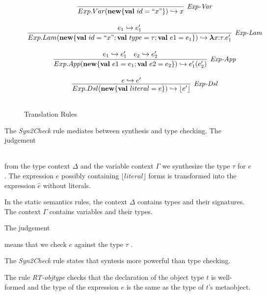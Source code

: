 \begin{figure}
\centering
\[
\begin{array}{c}

\infer[\textit{Exp-Var}]
	{Exp.Var(\keyw{new} \{\keyw{val}\ id=``x"\}) \hookrightarrow x  }
	{ } \\[3ex]

\infer[\textit{Exp-Lam}]
	{Exp.Lam(\keyw{new} \{\keyw{val}\ id=``x"; \keyw{val}\ type=\tau; \keyw{val}\ e1=e_1 \}) \hookrightarrow  \boldsymbol\lambda x{:}\tau . e'_1 }
	{e_1 \hookrightarrow e'_1 } \\[3ex]

\infer[\textit{Exp-App}]
	{Exp.App(\keyw{new} \{\keyw{val}\ e1=e_1;\keyw{val}\ e2=e_2\}) \hookrightarrow e'_1(e'_2)  }
	{e_1 \hookrightarrow e'_1 & e_2 \hookrightarrow e'_2  } \\[3ex]

\infer[\textit{Exp-Dsl}]
	{Exp.Dsl(\keyw{new} \{\keyw{val}\ literal= e \}) \hookrightarrow \lfloor e' \rfloor  }
	{e \hookrightarrow e' } \\[3ex]
   
\end{array}
\]
\caption{Translation Rules}
\end{figure}

The \textit{Syn2Check} rule mediates between synthesis and type checking. 
The judgement 

\\
\noindent
from the type context $\Delta$ and the variable context $\Gamma$ we synthesize the type $\tau$ for $e$. The  expression $e$ possibly containing $\lfloor literal \rfloor$ forms is transformed into the expression $\hat{e}$ without literals.

In the static semantics rules, the context $\Delta$ contains types and their signatures. The context $\Gamma$ contains variables and their types. 

The judgement 


means that we check $e$ against the type $\tau$ . 

The \textit{Syn2Check} rule states that syntesis more powerful than type checking.

The rule \textit{RT-objtype} checks that the declaration of the object type $t$ is well-formed and the type of the expression $e$ is the same as the type of $t$'s metaobject.

